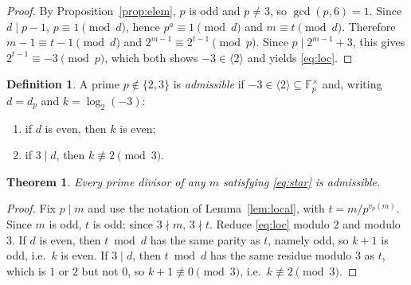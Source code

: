 \documentclass[11pt,reqno]{amsart}
\theoremstyle{plain}
\newtheorem{theorem}{Theorem}
\theoremstyle{definition}
\newtheorem{definition}{Definition}
\theoremstyle{remark}
\newcommand{\F}{\mathbb{F}}
\newcommand{\gen}[1]{\langle #1 \rangle}
\begin{document}
\begin{proof}
By Proposition~\ref{prop:elem}, $p$ is odd and $p\ne 3$, so $\gcd(p,6)=1$. Since $d\mid p-1$,
$p\equiv 1\pmod d$, hence $p^{a}\equiv 1\pmod d$ and $m\equiv t\pmod d$. Therefore
$m-1\equiv t-1\pmod d$ and $2^{m-1}\equiv 2^{t-1}\pmod p$. Since $p\mid 2^{m-1}+3$, this gives
$2^{t-1}\equiv-3\pmod p$, which both shows $-3\in\gen{2}$ and yields \eqref{eq:loc}.
\end{proof}

\begin{definition}\label{def:adm}
A prime $p\notin\{2,3\}$ is \emph{admissible} if $-3\in\gen{2}\subseteq\F_{p}^{\times}$ and,
writing $d=d_{p}$ and $k=\log_{2}(-3)$:
\begin{enumerate}[label=\textup{(\Alph*)}]
\item if $d$ is even, then $k$ is even;
\item if $3\mid d$, then $k\not\equiv 2\pmod 3$.
\end{enumerate}
\end{definition}

\begin{theorem}\label{thm:adm}
Every prime divisor of any $m$ satisfying \eqref{eq:star} is admissible.
\end{theorem}

\begin{proof}
Fix $p\mid m$ and use the notation of Lemma~\ref{lem:local}, with $t=m/p^{v_{p}(m)}$. Since $m$
is odd, $t$ is odd; since $3\nmid m$, $3\nmid t$. Reduce \eqref{eq:loc} modulo $2$ and modulo
$3$. If $d$ is even, then $t\bmod d$ has the same parity as $t$, namely odd, so $k+1$ is odd,
i.e.\ $k$ is even. If $3\mid d$, then $t\bmod d$ has the same residue modulo $3$ as $t$, which is
$1$ or $2$ but not $0$, so $k+1\not\equiv 0\pmod 3$, i.e.\ $k\not\equiv 2\pmod 3$.
\end{proof}
\end{document}
